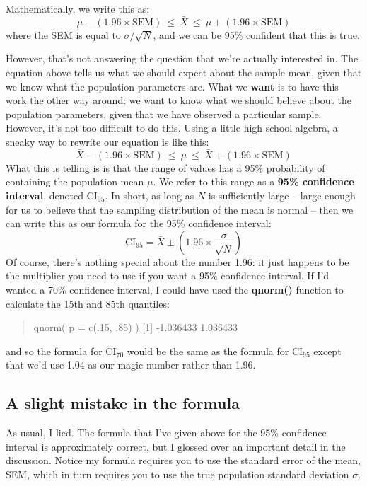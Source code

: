 \documentclass[]{book}
\begin{document}
Mathematically, we write this as: \[\mu - \left( 1.96 \times \mbox{SEM} \right) \ \leq \  \bar{X}\  \leq \  \mu + \left( 1.96 \times \mbox{SEM} \right)\] where the SEM is equal to \(\sigma / \sqrt{N}\), and we can be 95\% confident that this is true.

However, that's not answering the question that we're actually interested in. The equation above tells us what we should expect about the sample mean, given that we know what the population parameters are. What we \textbf{want} is to have this work the other way around: we want to know what we should believe about the population parameters, given that we have observed a particular sample. However, it's not too difficult to do this. Using a little high school algebra, a sneaky way to rewrite our equation is like this: \[\bar{X} -  \left( 1.96 \times \mbox{SEM} \right) \ \leq \ \mu  \ \leq  \ \bar{X} +  \left( 1.96 \times \mbox{SEM}\right)\] What this is telling is is that the range of values has a 95\% probability of containing the population mean \(\mu\). We refer to this range as a \textbf{95\% confidence interval}, denoted \(\mbox{CI}_{95}\). In short, as long as \(N\) is sufficiently large -- large enough for us to believe that the sampling distribution of the mean is normal -- then we can write this as our formula for the 95\% confidence interval: \[\mbox{CI}_{95} = \bar{X} \pm \left( 1.96 \times \frac{\sigma}{\sqrt{N}} \right)\] Of course, there's nothing special about the number 1.96: it just happens to be the multiplier you need to use if you want a 95\% confidence interval. If I'd wanted a 70\% confidence interval, I could have used the \textbf{qnorm()} function to calculate the 15th and 85th quantiles:

\begin{quote}
qnorm( p = c(.15, .85) ) {[}1{]} -1.036433 1.036433
\end{quote}

and so the formula for \(\mbox{CI}_{70}\) would be the same as the formula for \(\mbox{CI}_{95}\) except that we'd use 1.04 as our magic number rather than 1.96.

\hypertarget{a-slight-mistake-in-the-formula}{%
\subsection{A slight mistake in the formula}\label{a-slight-mistake-in-the-formula}}

As usual, I lied. The formula that I've given above for the 95\% confidence interval is approximately correct, but I glossed over an important detail in the discussion. Notice my formula requires you to use the standard error of the mean, SEM, which in turn requires you to use the true population standard deviation \(\sigma\).
\end{document}
